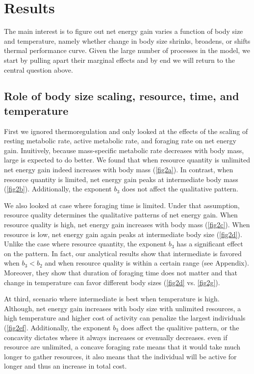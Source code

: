 \section*{Results}
The main interest is to figure out net energy gain varies a  function of body size and temperature, namely whether change in body size shrinks, broadens, or shifts thermal performance curve.
Given the large number of processes in the model, we start by pulling apart their marginal effects and by end we will return to the central question above.

\subsection*{Role of body size scaling, resource, time, and temperature}
First we ignored thermoregulation and only looked at the effects of the scaling of resting metabolic rate, active metabolic rate, and foraging rate on net energy gain.
Inuitively, because mass-specific metabolic rate decreases with body mass, large is expected to do better.
We found that when resource quantity is unlimited net energy gain indeed increases with body mass (\cref{fig2a}).
In contrast, when resource quantity is limited, net energy gain peaks at intermediate body mass (\cref{fig2b}).
Additionally, the exponent $b_3$ does not affect the qualitative pattern.

We also looked at case where foraging time is limited.
Under that assumption, resource quality determines the qualitative patterns of net energy gain.
When resource quality is high, net energy gain increases with body mass (\cref{fig2c}).
When resource is low,  net energy gain again peaks at intermediate body size (\cref{fig2d}).
Unlike the case where resource quantity, the exponent $b_3$ has a significant effect on the pattern.
In fact, our analytical results show that intermediate is favored when $b_3 < b_2$ and when resource quality is within a certain range (see Appendix).
Moreover, they show that duration of foraging time does not matter and that change in temperature can favor different body sizes (\cref{fig2d} vs. \cref{fig2g}).

At third, scenario where intermediate is best when temperature is high.
Although, net energy gain increases with body size with unlimited resources, a high temperature and higher cost of activity can penalize the largest individuals (\cref{fig2ef}.
Additionally, the exponent $b_3$ does affect the qualitive pattern, or the concavity dictates where it always increases or evenually decreases.
even if resource are unlimited,  a concave foraging rate means that it would take much longer to gather resources, it also means that the individual will be active for longer and thus an increase in total cost.

